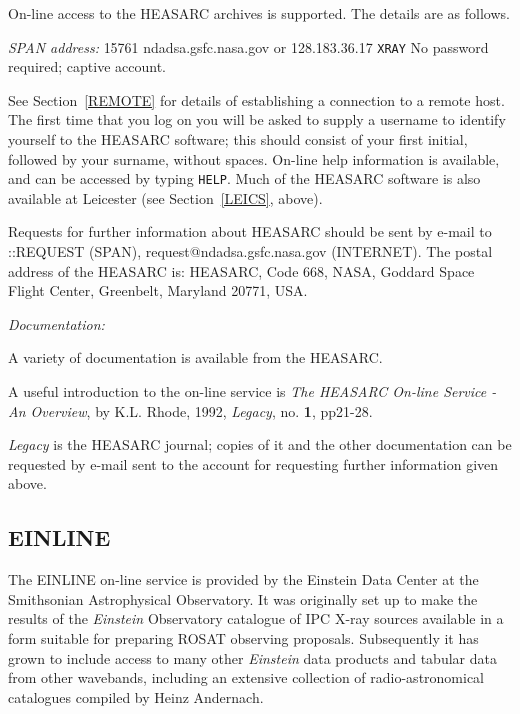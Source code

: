 \documentclass[twoside,11pt]{article}
\newcommand{\xlabel}[1]{}
\begin{document}
On-line access to the HEASARC archives is supported. The details are as
follows.

{\it SPAN address: } 15761
 ndadsa.gsfc.nasa.gov or 128.183.36.17
 \verb-XRAY-
 No password required; captive account.

See Section~\ref{REMOTE} for details of establishing a connection to
a remote host. The first time that you log on you will be asked to
supply a username to identify yourself to the HEASARC software; this
should consist of your first initial, followed by your surname, without
spaces. On-line help information is available, and can be accessed by
typing \verb-HELP-. Much of the HEASARC software is also available at
Leicester (see Section~\ref{LEICS}, above).

Requests for further information about HEASARC should be sent by e-mail
to
::REQUEST (SPAN), request@ndadsa.gsfc.nasa.gov (INTERNET).
The postal address of the HEASARC is: HEASARC, Code 668, NASA, Goddard
Space Flight Center, Greenbelt, Maryland 20771, USA.

{\it Documentation:}

A variety of documentation is available from the HEASARC.

A useful introduction to the on-line service is {\it The HEASARC On-line
Service - An Overview}, by K.L. Rhode, 1992, {\it Legacy}, no. {\bf 1},
pp21-28.

{\it Legacy} is the HEASARC journal; copies of it and the other
documentation can be requested by e-mail sent to the account for
requesting further information given above.

\subsection{EINLINE\xlabel{einline}}

The EINLINE on-line service is provided by the Einstein Data Center at
the Smithsonian Astrophysical Observatory. It was originally set up to
make the results of the {\it Einstein} Observatory catalogue of IPC
X-ray sources available in a form suitable for preparing ROSAT observing
proposals. Subsequently it has grown to include access to many other
{\it Einstein} data products and tabular data from other wavebands,
including an extensive collection of radio-astronomical catalogues
compiled by Heinz Andernach.
\end{document}
